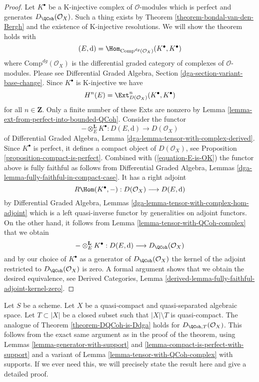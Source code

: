\begin{proof}
Let $K^\bullet$ be a K-injective complex of $\mathcal{O}$-modules which
is perfect and generates $D_\QCoh(\mathcal{O}_X)$. Such a
thing exists by Theorem \ref{theorem-bondal-van-den-Bergh}
and the existence of K-injective resolutions. We will show the
theorem holds with
$$
(E, \text{d}) = \Hom_{\text{Comp}^{dg}(\mathcal{O}_X)}(K^\bullet, K^\bullet)
$$
where $\text{Comp}^{dg}(\mathcal{O}_X)$ is the differential graded category
of complexes of $\mathcal{O}$-modules. Please see
Differential Graded Algebra, Section \ref{dga-section-variant-base-change}.
Since $K^\bullet$ is K-injective we
have
\begin{equation}
\label{equation-E-is-OK}
H^n(E) = \Ext^n_{D(\mathcal{O}_X)}(K^\bullet, K^\bullet)
\end{equation}
for all $n \in \mathbf{Z}$. Only a finite number of these Exts
are nonzero by Lemma \ref{lemma-ext-from-perfect-into-bounded-QCoh}.
Consider the functor
$$
- \otimes_E^\mathbf{L} K^\bullet :
D(E, \text{d}) \longrightarrow D(\mathcal{O}_X)
$$
of
Differential Graded Algebra, Lemma
\ref{dga-lemma-tensor-with-complex-derived}.
Since $K^\bullet$ is perfect, it defines a compact object of
$D(\mathcal{O}_X)$, see Proposition \ref{proposition-compact-is-perfect}.
Combined with (\ref{equation-E-is-OK}) the functor above is fully
faithful as follows from
Differential Graded Algebra, Lemmas
\ref{dga-lemma-fully-faithful-in-compact-case}. It has a right adjoint
$$
R\Hom(K^\bullet, - ) : D(\mathcal{O}_X) \longrightarrow D(E, \text{d})
$$
by Differential Graded Algebra, Lemmas
\ref{dga-lemma-tensor-with-complex-hom-adjoint}
which is a left quasi-inverse functor by generalities on adjoint
functors. On the other hand, it follows from
Lemma \ref{lemma-tensor-with-QCoh-complex} that we obtain
$$
- \otimes_E^\mathbf{L} K^\bullet :
D(E, \text{d}) \longrightarrow D_\QCoh(\mathcal{O}_X)
$$
and by our choice of $K^\bullet$ as a generator of
$D_\QCoh(\mathcal{O}_X)$ the kernel of the adjoint
restricted to $D_\QCoh(\mathcal{O}_X)$ is zero.
A formal argument shows that we obtain the desired equivalence, see
Derived Categories, Lemma
\ref{derived-lemma-fully-faithful-adjoint-kernel-zero}.
\end{proof}

\begin{remark}
\label{remark-DQCoh-is-Ddga-with-support}
Let $S$ be a scheme.
Let $X$ be a quasi-compact and quasi-separated algebraic space.
Let $T \subset |X|$ be a closed subset such that
$|X| \setminus T$ is quasi-compact.
The analogue of Theorem \ref{theorem-DQCoh-is-Ddga} holds
for $D_{\QCoh, T}(\mathcal{O}_X)$.
This follows from the exact same argument as in the proof
of the theorem, using
Lemmas \ref{lemma-generator-with-support} and
\ref{lemma-compact-is-perfect-with-support}
and a variant of Lemma \ref{lemma-tensor-with-QCoh-complex}
with supports.
If we ever need this, we will precisely state the
result here and give a detailed proof.
\end{remark}

